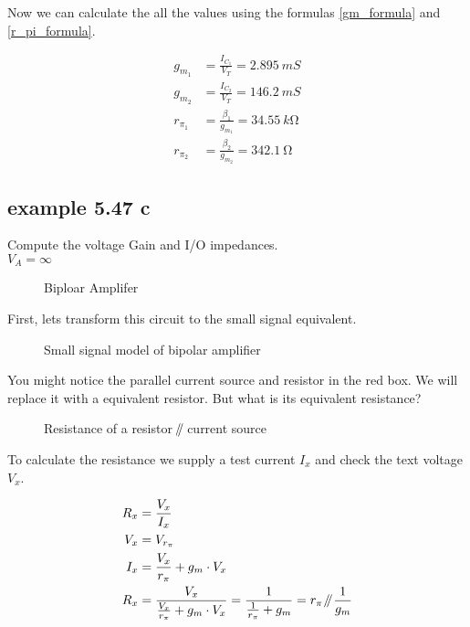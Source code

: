 \documentclass[11ypt]{extarticle}
\newcommand{\parallelEE}{\mathbin{\!/\mkern-5mu/\!}} %
\begin{document}
Now we can calculate the all the values using the formulas \eqref{gm_formula} and \eqref{r_pi_formula}.

\begin{equation}
\begin{aligned}
g_{m_1} &= \frac{I_{C_1}}{V_T} = \SI{2.895}{mS}
\\
g_{m_2} &= \frac{I_{C_2}}{V_T} = \SI{146.2}{mS}
\\
r_{\pi_1} &= \frac{\beta_1}{g_{m_1}} = \SI{34.55}{k \ohm}
\\
r_{\pi_2} &= \frac{\beta_2}{g_{m_2}} = \SI{342.1}{\ohm}
\end{aligned}
\end{equation}

\subsection{example 5.47 c}
Compute the voltage Gain and I/O impedances. \\
$V_A = \infty$
\begin{figure}[H]{}
\centering

\caption{Biploar Amplifer}
\end{figure}
First, lets transform this circuit to the small signal equivalent.

\begin{figure}[H]{}
\centering

\caption{Small signal model of bipolar amplifier}
\end{figure}
You might notice the parallel current source and resistor in the red box. We will replace it with a equivalent resistor.
But what is its equivalent resistance?

\begin{figure}[H]{}
\centering

\caption{Resistance of a resistor $\parallelEE$ current source}
\end{figure}
To calculate the resistance we supply a test current $I_x$ and check the text voltage $V_x$.

\begin{equation}
    \begin{aligned}
    R_x &= \frac{V_x}{I_x} \\
    V_x &= V_{r_{\pi}} \\
    I_x &= \frac{V_x}{r_\pi} + g_m \cdot V_x \\
    R_x &= \frac{V_x}{\frac{V_x}{r_\pi} + g_m \cdot V_x} = \frac{1}{\frac{1}{r_\pi} + g_m} = r_\pi \parallelEE \frac{1}{g_m}
    \end{aligned}
\end{equation}
\end{document}
